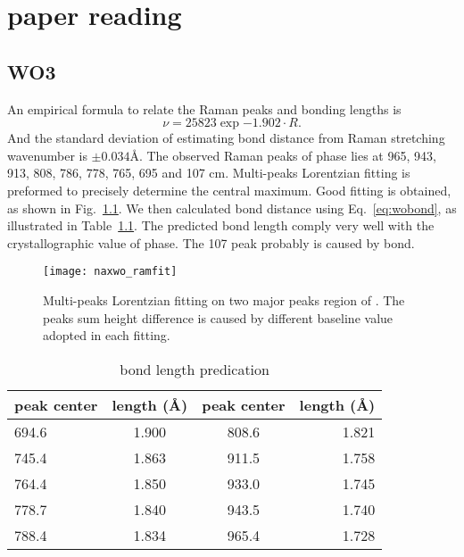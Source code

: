 \chapter{paper reading}

\section{WO3}

An empirical formula to relate the Raman peaks and  bonding lengths \cite{Hardcastle1995} is
\begin{equation}\label{eq:wobond}
\nu = 25823 \exp{-1.902\cdot R}.
\end{equation}
And the standard deviation of estimating  bond distance from Raman stretching wavenumber is $\pm0.034$\AA.
The observed Raman peaks of  phase lies at 965, 943, 913, 808, 786, 778, 765, 695 and 107 cm. Multi-peaks Lorentzian fitting is preformed to precisely determine the central maximum. Good fitting is obtained, as shown in Fig.~\ref{fig:naworamfit}. We then calculated  bond distance using Eq.~\ref{eq:wobond}, as illustrated in Table~\ref{tab:nawobond}. The predicted  bond length comply very well with the crystallographic value of  phase.\cite{Triantafyllou1999a} The 107 peak probably is caused by  bond.
\begin{figure}[htb]
\centering
\texttt{[image: naxwo\_ramfit]}
\caption[ Raman fitting]{Multi-peaks Lorentzian fitting on two major peaks region of . The peaks sum height difference is caused by different baseline value adopted in each fitting.}
\label{fig:naworamfit}
\end{figure}

\begin{table}[htb]
\centering
\caption{ bond length predication}\label{tab:nawobond}
\begin{tabular}{lccr}
\toprule
peak center & length (\AA) & peak center & length (\AA) \\
\midrule
694.6 & 1.900 &  808.6 &  1.821 \\
745.4 & 1.863 &  911.5 &  1.758 \\
764.4 & 1.850 &  933.0 &  1.745 \\
778.7 & 1.840 &   943.5 & 1.740 \\
788.4 & 1.834 &   965.4 & 1.728 \\
\bottomrule
\end{tabular}
\end{table}

